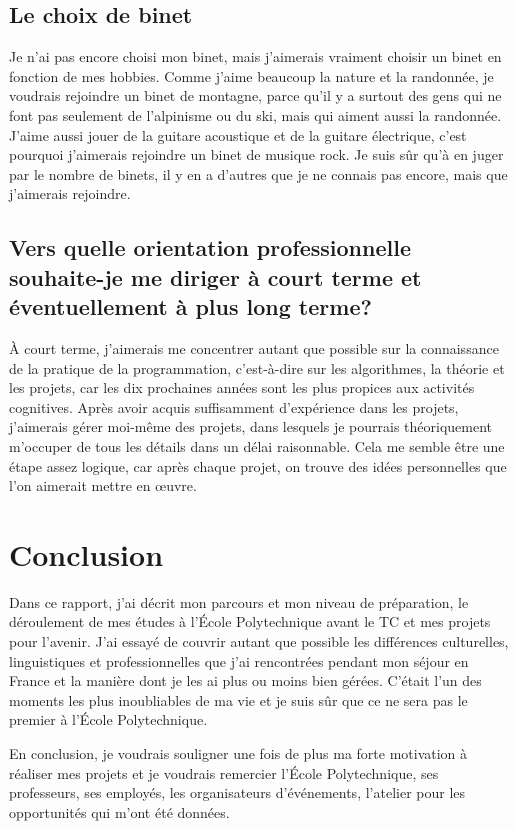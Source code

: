\documentclass[a4paper,12pt]{article}
\begin{document}
	\subsection{Le choix de binet}
	Je n'ai pas encore choisi mon binet, mais j'aimerais vraiment choisir un binet en fonction de mes hobbies. Comme j'aime beaucoup la nature et la randonnée, je voudrais rejoindre un binet de montagne, parce qu'il y a surtout des gens qui ne font pas seulement de l'alpinisme ou du ski, mais qui aiment aussi la randonnée. J'aime aussi jouer de la guitare acoustique et de la guitare électrique, c'est pourquoi j'aimerais rejoindre un binet de musique rock. Je suis sûr qu'à en juger par le nombre de binets, il y en a d'autres que je ne connais pas encore, mais que j'aimerais rejoindre. 
	
	\subsection{Vers quelle orientation professionnelle souhaite-je me diriger à court terme et éventuellement à plus long terme?}
	
	À court terme, j'aimerais me concentrer autant que possible sur la connaissance de la pratique de la programmation, c'est-à-dire sur les algorithmes, la théorie et les projets, car les dix prochaines années sont les plus propices aux activités cognitives. Après avoir acquis suffisamment d'expérience dans les projets, j'aimerais gérer moi-même des projets, dans lesquels je pourrais théoriquement m'occuper de tous les détails dans un délai raisonnable. Cela me semble être une étape assez logique, car après chaque projet, on trouve des idées personnelles que l'on aimerait mettre en œuvre. 
%	

	
	\section{Conclusion}

Dans ce rapport, j'ai décrit mon parcours et mon niveau de préparation, le déroulement de mes études à l'École Polytechnique avant le TC et mes projets pour l'avenir. J'ai essayé de couvrir autant que possible les différences culturelles, linguistiques et professionnelles que j'ai rencontrées pendant mon séjour en France et la manière dont je les ai plus ou moins bien gérées. C'était l'un des moments les plus inoubliables de ma vie et je suis sûr que ce ne sera pas le premier à l'École Polytechnique.  

En conclusion, je voudrais souligner une fois de plus ma forte motivation à réaliser mes projets et je voudrais remercier l'École Polytechnique, ses professeurs, ses employés, les organisateurs d'événements, l'atelier pour les opportunités qui m'ont été données.  
\end{document}
